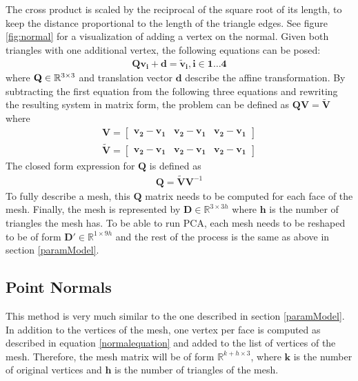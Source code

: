 The cross product is scaled by the reciprocal of the square root of its length, to keep the distance proportional to the length of the triangle edges. See figure \ref{fig:normal} for a visualization of adding a vertex on the normal.
Given both triangles with one additional vertex, the following equations can be posed:
\begin{gather}
 \mathbf{Q}\mathbf{v_i}+\mathbf{d} = \mathbf{\tilde{v}_i}, \mathbf{i} \in \mathbf{1} \dotsc \mathbf{4}
\end{gather}
where $\mathbf{Q} \in \mathbb{R}^{3 \times 3}$ and translation vector $\mathbf{d}$ describe the affine transformation. By subtracting the first equation from the following three equations and rewriting the resulting system in matrix form, the problem can be defined as $\mathbf{Q}\mathbf{V}=\mathbf{\tilde{V}}$ where
\begin{gather}
  \mathbf{V} =
  \begin{bmatrix}
   \mathbf{v_2} - \mathbf{v_1}&\mathbf{v_2} - \mathbf{v_1}&\mathbf{v_2} - \mathbf{v_1}
  \end{bmatrix} \\
  \mathbf{\tilde{V}} =
  \begin{bmatrix}
   \mathbf{\mathbf{v}_2} - \mathbf{\mathbf{v}_1}&\mathbf{\mathbf{v}_2} - \mathbf{\mathbf{v}_1}&\mathbf{\mathbf{v}_2} - \mathbf{\mathbf{v}_1}
  \end{bmatrix}
\end{gather}
The closed form expression for $\mathbf{Q}$ is defined as
\begin{gather}
  \mathbf{Q}=\mathbf{\tilde{V}}\mathbf{V}^{-1}
\end{gather}
To fully describe a mesh, this $\mathbf{Q}$ matrix needs to be computed for each face of the mesh. Finally, the mesh is represented by $\mathbf{D} \in \mathbb{R}^{3 \times 3h}$ where $\mathbf{h}$ is the number of triangles the mesh has. To be able to run PCA, each mesh needs to be reshaped to be of form $\mathbf{D'} \in \mathbb{R}^{1 \times 9h}$ and the rest of the process is the same as above in section \ref{paramModel}.

\subsection{Point Normals}
This method is very much similar to the one described in section \ref{paramModel}. In addition to the vertices of the mesh, one vertex per face is computed as described in equation \ref{normalequation} and added to the list of vertices of the mesh. Therefore, the mesh matrix will be of form $\mathbb{R}^{k+h \times 3}$, where $\mathbf{k}$ is the number of original vertices and $\mathbf{h}$ is the number of triangles of the mesh.


